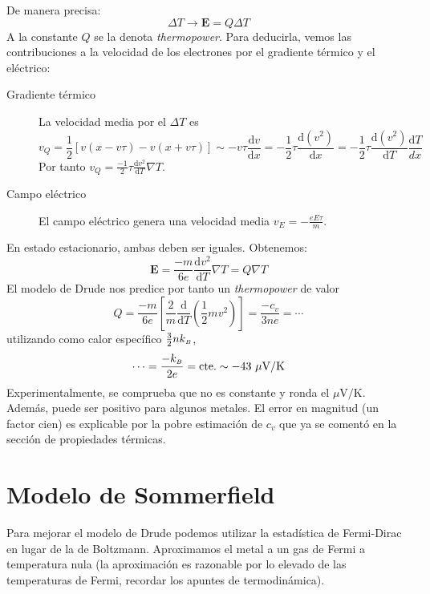 De manera precisa:
\begin{equation}
  \Delta T \rightarrow \mathbf{E} = Q \Delta T
\end{equation}
A la constante $Q$ se la denota \emph{thermopower}. Para deducirla,
vemos las contribuciones a la velocidad de los electrones por el
gradiente térmico y el eléctrico:
\begin{description}
\item[Gradiente térmico] La velocidad media por el $\Delta T$ es
\begin{equation}
  v_Q = \frac{1}{2}[v(x-v\tau) - v(x+v\tau)] \sim - v\tau
  \frac{\text{d}v}{\text{d}x} = - \frac{1}{2}\tau
  \frac{\text{d}(v^2)}{\text{d}x} = -\frac{1}{2}\tau \frac{\text{d}(v^2)}{\text{d}T}\frac{\text{d}T}{dx}
\end{equation}
Por tanto $v_Q = \frac{-1}{2}\tau \frac{\text{d}v^2}{\text{d}T} \nabla
T$.
\item[Campo eléctrico] El campo eléctrico genera una velocidad media
  $v_E = - \frac{e E \tau}{m}$.
\end{description}
En estado estacionario, ambas deben ser iguales. Obtenemos:
\begin{equation}
  \mathbf{E} = \frac{-m}{6e} \frac{\text{d}v^2}{\text{d}T} \nabla T =
  Q \nabla T
\end{equation}
El modelo de Drude nos predice por tanto un \emph{thermopower} de
valor
\begin{equation}
  Q = \frac{-m}{6e} \left[ \frac{2}{m}
    \frac{\text{d}}{\text{d}T}\left( \frac{1}{2}mv^2 \right) \right]
  = \frac{-c_v}{3ne} = \cdots
\end{equation}
utilizando como calor específico $\frac{3}{2}n k_{\scriptscriptstyle{B}} $,
\begin{equation}
  \cdots = \frac{-k_{\scriptscriptstyle{B}} }{2e} = \text{cte.} \sim -43 \ \mu\text{V/K}
\end{equation}
Experimentalmente, se comprueba que no es constante y ronda el
$\mu \text{V/K}$. Además, puede ser positivo para algunos metales. El
error en magnitud (un factor cien) es explicable por la pobre
estimación de $c_v$ que ya se comentó en la sección de propiedades
térmicas.

\chapter{Modelo de Sommerfield}
Para mejorar el modelo de Drude podemos utilizar la estadística de
Fermi-Dirac en lugar de la de Boltzmann. Aproximamos el metal a un gas
de Fermi a temperatura nula (la aproximación es razonable por lo
elevado de las temperaturas de Fermi, recordar los apuntes de
termodinámica).

